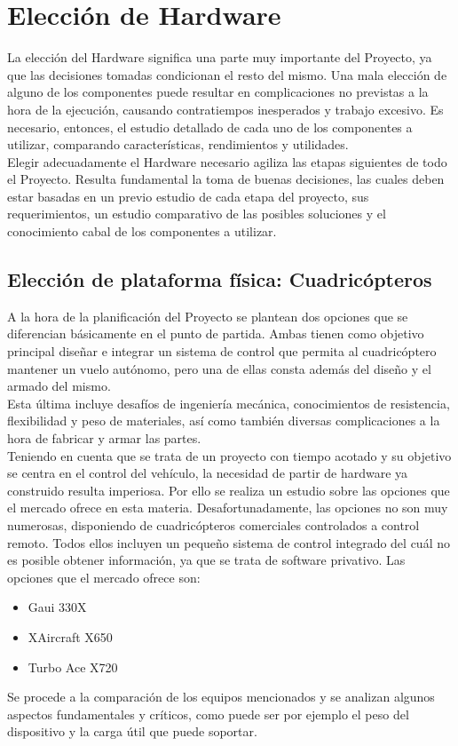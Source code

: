 \documentclass[main]{subfiles}
\begin{document}
\chapter{Elecci\'on de Hardware}


La elecci\'on del Hardware significa una parte muy importante del Proyecto, ya que las decisiones tomadas condicionan el resto del mismo. Una mala elecci\'on de alguno de los componentes puede resultar en complicaciones no previstas a la hora de la ejecuci\'on, causando contratiempos inesperados y trabajo excesivo. Es necesario, entonces, el estudio detallado de cada uno de los componentes a utilizar, comparando caracter\'isticas, rendimientos y utilidades. \\
Elegir adecuadamente el Hardware necesario agiliza las etapas siguientes de todo el Proyecto. Resulta fundamental la toma de buenas decisiones, las cuales deben estar basadas en un previo estudio de cada etapa del proyecto, sus requerimientos, un estudio comparativo de las posibles soluciones y el conocimiento cabal de los componentes a utilizar.\\

\section{Elecci\'on de plataforma f\'isica: Cuadric\'opteros}
\vspace*{15pt}

A la hora de la planificaci\'on del Proyecto se plantean dos opciones que se diferencian b\'asicamente en el punto de partida. Ambas tienen como objetivo principal dise\~nar e integrar un sistema de control que permita al cuadric\'optero mantener un vuelo aut\'onomo, pero una de ellas consta adem\'as del dise\~no y el armado del mismo. \\Esta \'ultima incluye desaf\'ios de ingenier\'ia mec\'anica, conocimientos de resistencia, flexibilidad y peso de materiales, as\'i como tambi\'en diversas complicaciones a la hora de fabricar y armar las partes. \\ Teniendo en cuenta que se trata de un proyecto con tiempo acotado y su objetivo se centra en el control del veh\'iculo, la necesidad de partir de hardware ya construido resulta imperiosa. Por ello se realiza un estudio sobre las opciones que el mercado ofrece en esta materia. Desafortunadamente, las opciones no son muy numerosas, disponiendo de cuadric\'opteros comerciales controlados a control remoto. Todos ellos incluyen un peque\~no sistema de control integrado del cu\'al no es posible obtener informaci\'on, ya que se trata de software privativo. Las opciones que el mercado ofrece son: 
\begin{itemize}
	\item Gaui 330X
	\item XAircraft X650
	\item Turbo Ace X720
\end{itemize}
Se procede a la comparaci\'on de los equipos mencionados y se analizan algunos aspectos fundamentales y cr\'iticos, como puede ser por ejemplo el peso del dispositivo y la carga \'util que puede soportar.\\[20pt]
\end{document}

